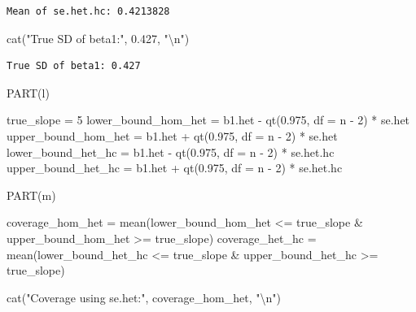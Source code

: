 \documentclass[
  11pt,
]{article}
\newenvironment{Shaded}{\begin{snugshade}}{\end{snugshade}}
\newcommand{\AttributeTok}[1]{\textcolor[rgb]{0.40,0.45,0.13}{#1}}
\newcommand{\DecValTok}[1]{\textcolor[rgb]{0.68,0.00,0.00}{#1}}
\newcommand{\FloatTok}[1]{\textcolor[rgb]{0.68,0.00,0.00}{#1}}
\newcommand{\FunctionTok}[1]{\textcolor[rgb]{0.28,0.35,0.67}{#1}}
\newcommand{\NormalTok}[1]{\textcolor[rgb]{0.00,0.23,0.31}{#1}}
\newcommand{\OtherTok}[1]{\textcolor[rgb]{0.00,0.23,0.31}{#1}}
\newcommand{\SpecialCharTok}[1]{\textcolor[rgb]{0.37,0.37,0.37}{#1}}
\newcommand{\StringTok}[1]{\textcolor[rgb]{0.13,0.47,0.30}{#1}}
\begin{document}
\begin{verbatim}
Mean of se.het.hc: 0.4213828 
\end{verbatim}

\begin{Shaded}
\begin{Highlighting}[]
\FunctionTok{cat}\NormalTok{(}\StringTok{"True SD of beta1:"}\NormalTok{, }\FloatTok{0.427}\NormalTok{, }\StringTok{"}\SpecialCharTok{\textbackslash{}n}\StringTok{"}\NormalTok{)}
\end{Highlighting}
\end{Shaded}

\begin{verbatim}
True SD of beta1: 0.427 
\end{verbatim}

PART(l)

\begin{Shaded}
\begin{Highlighting}[]
\NormalTok{true\_slope }\OtherTok{=} \DecValTok{5}
\NormalTok{lower\_bound\_hom\_het }\OtherTok{=}\NormalTok{ b1.het }\SpecialCharTok{{-}} \FunctionTok{qt}\NormalTok{(}\FloatTok{0.975}\NormalTok{, }\AttributeTok{df =}\NormalTok{ n }\SpecialCharTok{{-}} \DecValTok{2}\NormalTok{) }\SpecialCharTok{*}\NormalTok{ se.het}
\NormalTok{upper\_bound\_hom\_het }\OtherTok{=}\NormalTok{ b1.het }\SpecialCharTok{+} \FunctionTok{qt}\NormalTok{(}\FloatTok{0.975}\NormalTok{, }\AttributeTok{df =}\NormalTok{ n }\SpecialCharTok{{-}} \DecValTok{2}\NormalTok{) }\SpecialCharTok{*}\NormalTok{ se.het}
\NormalTok{lower\_bound\_het\_hc }\OtherTok{=}\NormalTok{ b1.het }\SpecialCharTok{{-}} \FunctionTok{qt}\NormalTok{(}\FloatTok{0.975}\NormalTok{, }\AttributeTok{df =}\NormalTok{ n }\SpecialCharTok{{-}} \DecValTok{2}\NormalTok{) }\SpecialCharTok{*}\NormalTok{ se.het.hc}
\NormalTok{upper\_bound\_het\_hc }\OtherTok{=}\NormalTok{ b1.het }\SpecialCharTok{+} \FunctionTok{qt}\NormalTok{(}\FloatTok{0.975}\NormalTok{, }\AttributeTok{df =}\NormalTok{ n }\SpecialCharTok{{-}} \DecValTok{2}\NormalTok{) }\SpecialCharTok{*}\NormalTok{ se.het.hc}
\end{Highlighting}
\end{Shaded}

PART(m)

\begin{Shaded}
\begin{Highlighting}[]
\NormalTok{coverage\_hom\_het }\OtherTok{=} \FunctionTok{mean}\NormalTok{(lower\_bound\_hom\_het }\SpecialCharTok{\textless{}=}\NormalTok{ true\_slope }\SpecialCharTok{\&}\NormalTok{ upper\_bound\_hom\_het }\SpecialCharTok{\textgreater{}=}\NormalTok{ true\_slope)}
\NormalTok{coverage\_het\_hc }\OtherTok{=} \FunctionTok{mean}\NormalTok{(lower\_bound\_het\_hc }\SpecialCharTok{\textless{}=}\NormalTok{ true\_slope }\SpecialCharTok{\&}\NormalTok{ upper\_bound\_het\_hc }\SpecialCharTok{\textgreater{}=}\NormalTok{ true\_slope)}

\FunctionTok{cat}\NormalTok{(}\StringTok{"Coverage using se.het:"}\NormalTok{, coverage\_hom\_het, }\StringTok{"}\SpecialCharTok{\textbackslash{}n}\StringTok{"}\NormalTok{)}
\end{Highlighting}
\end{Shaded}
\end{document}
